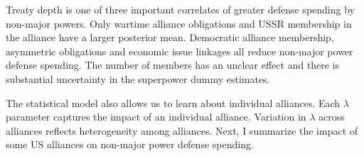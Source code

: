 \documentclass[12pt]{article}
\begin{document}
Treaty depth is one of three important correlates of greater defense spending by non-major powers. 
Only wartime alliance obligations and USSR membership in the alliance have a larger posterior mean.
Democratic alliance membership, asymmetric obligations and economic issue linkages all reduce non-major power defense spending.  
The number of members has an unclear effect and there is substantial uncertainty in the superpower dummy estimates. 


%
%
%
%


The statistical model also allows us to learn about individual alliances. 
Each $\lambda$ parameter captures the impact of an individual alliance. 
Variation in $\lambda$ across alliances reflects heterogeneity among alliances. 
Next, I summarize the impact of some US alliances on non-major power defense spending. 
\end{document}
